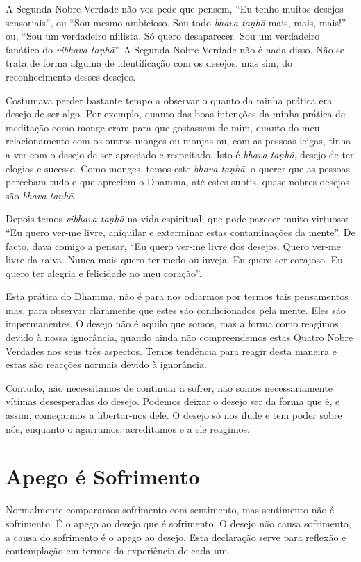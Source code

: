 A Segunda Nobre Verdade não vos pede que pensem, “Eu tenho muitos desejos
sensoriais”, ou “Sou mesmo ambicioso. Sou todo \emph{bhava taṇhā} mais, mais,
mais!” ou, “Sou um verdadeiro niilista. Só quero desaparecer. Sou um verdadeiro
fanático do \emph{vibhava taṇhā}”. A Segunda Nobre Verdade não é nada disso. Não
se trata de forma alguma de identificação com os desejos, mas sim, do
reconhecimento desses desejos.

Costumava perder bastante tempo a observar o quanto da minha prática era desejo
de ser algo. Por exemplo, quanto das boas intenções da minha prática de
meditação como monge eram para que gostassem de mim, quanto do meu
relacionamento com os outros monges ou monjas ou, com as pessoas leigas, tinha a
ver com o desejo de ser apreciado e respeitado. Isto é \emph{bhava taṇhā},
desejo de ter elogios e sucesso. Como monges, temos este \emph{bhava taṇhā}; o
querer que as pessoas percebam tudo e que apreciem o Dhamma, até estes subtis,
quase nobres desejos são \emph{bhava taṇhā}.

Depois temos \emph{vibhava taṇhā} na vida espiritual, que pode parecer muito
virtuoso: “Eu quero ver-me livre, aniquilar e exterminar estas contaminações da
mente”. De facto, dava comigo a pensar, “Eu quero ver-me livre dos desejos.
Quero ver-me livre da raiva. Nunca mais quero ter medo ou inveja. Eu quero ser
corajoso. Eu quero ter alegria e felicidade no meu coração”.

Esta prática do Dhamma, não é para nos odiarmos por termos tais pensamentos mas,
para observar claramente que estes são condicionados pela mente. Eles são
impermanentes. O desejo não é aquilo que somos, mas a forma como reagimos devido
à nossa ignorância, quando ainda não compreendemos estas Quatro Nobre Verdades
nos seus três aspectos. Temos tendência para reagir desta maneira e estas são
reacções normais devido à ignorância.

Contudo, não necessitamos de continuar a sofrer, não somos necessariamente
vítimas desesperadas do desejo. Podemos deixar o desejo ser da forma que é, e
assim, começarmos a libertar-nos dele. O desejo só nos ilude e tem poder sobre
nós, enquanto o agarramos, acreditamos e a ele reagimos.

\section{Apego é Sofrimento}

Normalmente comparamos sofrimento com sentimento, mas sentimento não é
sofrimento. É o apego ao desejo que é sofrimento. O desejo não causa sofrimento,
a causa do sofrimento é o apego ao desejo. Esta declaração serve para reflexão e
contemplação em termos da experiência de cada um.

